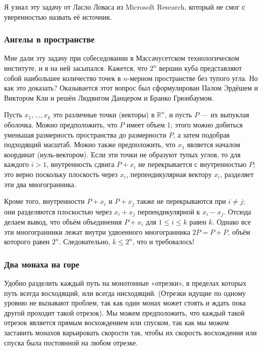 Я узнал эту задачу от Ласло Ловаса из Microsoft Research, который не смог с уверенностью назвать её источник.

\subsubsection*{Ангелы в пространстве}

Мне дали эту задачу при собеседовании в Массачусетском технологическом институте, и я на ней засыпался.
Кажется, что $2^n$ вершин куба представляют собой наибольшее количество точек в $n$-мерном пространстве без тупого угла.
Но как это доказать?
Оказывается этот вопрос был сформулирован Палом Эрдёшем и Виктором Кли и решён Людвигом Данцером и Бранко Грюнбаумом. %

Пусть $x_1,\dots,x_k$ это различные точки (векторы) в $\mathbb{R}^n$, и пусть $P$ --- их выпуклая оболочка.
Можно предположить, что $P$ имеет объем 1;
этого можно добиться уменьшая размерность пространства до размерности $P$, а затем подобрав подходящий масштаб.
Можно также предположить, что $x_1$ является началом координат (нуль-вектором).
Если эти точки не образуют тупых углов, то для каждого $i>1$, внутренность сдвига $P+x_i$ не перекрывается с внутренностью $P$;
это верно поскольку плоскость через $x_i$, перпендикулярная вектору $x_i$, разделяет эти два многогранника.

Кроме того, внутренности $P+x_i$ и $P+x_j$ также не перекрываются при $i\ne j$;
они разделяются плоскостью через $x_i+x_j$ перпендикулярной к $x_i-x_j$.
Отсюда делаем вывод, что объём объединения $P+x_i$ для $1 \le i \le k$ равен $k$.
Однако все эти многогранники лежат внутри удвоенного многогранника $2P = P+P$, объём которого равен $2^n$. Следовательно, $k \le 2^n$, что и требовалось!
\heart

\subsubsection*{Два монаха на горе}

Удобно разделить каждый путь на монотонные «отрезки», в пределах которых путь всегда восходящий, или всегда нисходящий. %
(Отрезки идущие по одному уровню не вызывают проблем, так как один монах может стоять и ждать пока другой проходит такой отрезок).
Мы можем предположить, что каждый такой отрезок является прямым восхождением или спуском, так как мы можем заставить монахов варьировать скорости так, чтобы их скорость восхождения или спуска была постоянной на любом отрезке.

